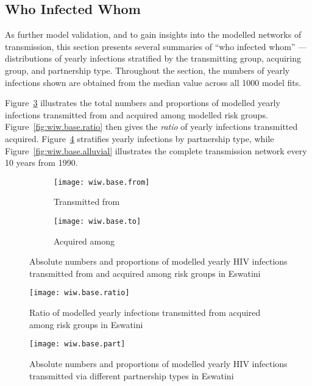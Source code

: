 \subsection{Who Infected Whom}\label{model.res.wiw}
As further model validation, and to gain insights into the modelled networks of transmission,
this section presents several summaries of ``who infected whom''
--- \ie distributions of yearly infections stratified by
the transmitting group, acquiring group, and partnership type.
Throughout the section, the numbers of yearly infections shown are obtained from
the median value across all 1000 model fits.
\par
Figure~\ref{fig:wiw.base.frto} illustrates
the total numbers and proportions of modelled yearly infections
transmitted from  and
acquired among  modelled risk groups.
Figure~\ref{fig:wiw.base.ratio} then gives
the \emph{ratio} of yearly infections transmitted \vs acquired.
Figure~\ref{fig:wiw.base.part} stratifies yearly infections by partnership type, while
Figure~\ref{fig:wiw.base.alluvial} illustrates
the complete transmission network every 10 years from 1990.
\begin{figure}
  \begin{subfigure}{.5\linewidth}
    \texttt{[image: wiw.base.from]}
    \caption{Transmitted from}
    \label{fig:wiw.base.from}
  \end{subfigure}%
  \begin{subfigure}{.5\linewidth}
    \texttt{[image: wiw.base.to]}
    \caption{Acquired among}
    \label{fig:wiw.base.to}
  \end{subfigure}
  \caption{Absolute numbers and proportions of modelled yearly HIV infections
     transmitted from and  acquired among
    risk groups in Eswatini}
  \label{fig:wiw.base.frto}
\end{figure}
\begin{figure}
  \begin{minipage}[b]{.49\linewidth}
    \texttt{[image: wiw.base.ratio]}
    \caption{Ratio of modelled yearly infections transmitted from \vs acquired among
      risk groups in Eswatini}
    \label{fig:wiw.base.ratio}
  \end{minipage}\hfill
  \begin{minipage}[b]{.49\linewidth}
    \texttt{[image: wiw.base.part]}
    \caption{Absolute numbers and proportions of modelled yearly HIV infections
    transmitted via different partnership types in Eswatini}
    \label{fig:wiw.base.part}
  \end{minipage}
\end{figure}
